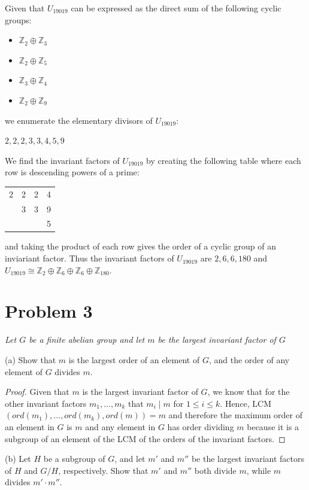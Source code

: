 \documentclass{article}
\theoremstyle{plain} %
\theoremstyle{definition} %
\newcommand{\bbZ}{\mathbb{Z}}
\begin{document}
Given that $U_{19019}$ can be expressed as the direct sum of
the following cyclic groups:
\begin{itemize}
    \item $\bbZ_{2} \oplus \bbZ_{3}$
    \item $\bbZ_{2} \oplus \bbZ_{5}$
    \item $\bbZ_{3} \oplus \bbZ_{4}$
    \item $\bbZ_{2} \oplus \bbZ_{9}$
\end{itemize}
we enumerate the elementary divisors of $U_{19019}$:

$\boxed{2,2,2,3,3,4,5,9}$

We find the invariant factors of $U_{19019}$ by creating
the following table where each row is descending powers of
a prime:
\begin{center}
    \begin{tabular}{c|c|c|c}
        2 & 2 & 2 & 4 \\
          & 3 & 3 & 9 \\
          &   &   & 5 \\
    \end{tabular}
\end{center}
and taking the product of each row gives the order of a
cyclic group of an inviariant factor. Thus the invariant
factors of $U_{19019}$ are $\boxed{2, 6, 6, 180}$ and
$U_{19019} \cong \bbZ_2 \oplus \bbZ_6 \oplus \bbZ_6 \oplus \bbZ_{180}$.

\section*{Problem 3}
\noindent\textit{Let $G$ be a finite abelian group and let $m$
be the largest invariant factor of $G$}

\noindent (a) Show that $m$ is the largest order of an element
of $G$, and the order of any element of $G$ divides $m$.

\begin{proof}
    Given that $m$ is the largest invariant factor of $G$, we know that
    for the other invariant factors $m_1, \dots, m_k$ that $m_i \mid m$ for 
    $1 \leq i \leq k$. Hence, LCM$(ord(m_1),\dots, ord(m_k), ord(m)) = m$ and therefore
    the maximum order of an element in $G$ is $m$ and any element
    in $G$ has order dividing $m$ because it is a subgroup of
    an element of the LCM of the orders of the invariant factors. 
\end{proof}

\noindent (b) Let $H$ be a subgroup of $G$, and let $m'$ and $m''$
be the largest invariant factors of $H$ and $G/H$, respectively.
Show that $m'$ and $m''$ both divide $m$, while $m$ divides 
$m'\cdot m''$.
\end{document}
